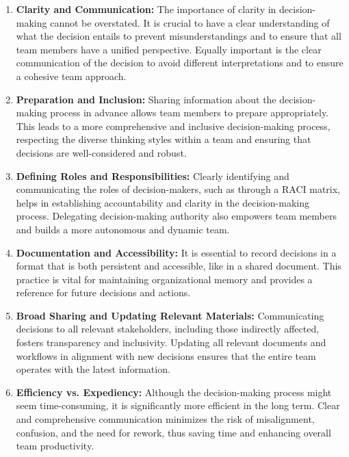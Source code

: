 \documentclass[12pt]{article}
\begin{document}
\begin{enumerate}
    \item \textbf{Clarity and Communication:} The importance of clarity in decision-making cannot be overstated. It is crucial to have a clear understanding of what the decision entails to prevent misunderstandings and to ensure that all team members have a unified perspective. Equally important is the clear communication of the decision to avoid different interpretations and to ensure a cohesive team approach.

    \item \textbf{Preparation and Inclusion:} Sharing information about the decision-making process in advance allows team members to prepare appropriately. This leads to a more comprehensive and inclusive decision-making process, respecting the diverse thinking styles within a team and ensuring that decisions are well-considered and robust.

    \item \textbf{Defining Roles and Responsibilities:} Clearly identifying and communicating the roles of decision-makers, such as through a RACI matrix, helps in establishing accountability and clarity in the decision-making process. Delegating decision-making authority also empowers team members and builds a more autonomous and dynamic team.

    \item \textbf{Documentation and Accessibility:} It is essential to record decisions in a format that is both persistent and accessible, like in a shared document. This practice is vital for maintaining organizational memory and provides a reference for future decisions and actions.

    \item \textbf{Broad Sharing and Updating Relevant Materials:} Communicating decisions to all relevant stakeholders, including those indirectly affected, fosters transparency and inclusivity. Updating all relevant documents and workflows in alignment with new decisions ensures that the entire team operates with the latest information.

    \item \textbf{Efficiency vs. Expediency:} Although the decision-making process might seem time-consuming, it is significantly more efficient in the long term. Clear and comprehensive communication minimizes the risk of misalignment, confusion, and the need for rework, thus saving time and enhancing overall team productivity.
\end{enumerate}
\end{document}
